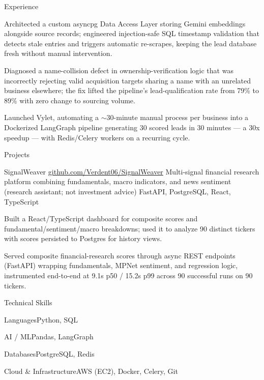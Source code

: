 \documentclass[
	11pt
]{../../../template}
\begin{document}
\begin{rSection}{E}{xperience}
\begin{rSectionEntry}
			\item Architected a custom asyncpg Data Access Layer storing Gemini embeddings alongside source records; engineered injection-safe SQL timestamp validation that detects stale entries and triggers automatic re-scrapes, keeping the lead database fresh without manual intervention.
			\item Diagnosed a name-collision defect in ownership-verification logic that was incorrectly rejecting valid acquisition targets sharing a name with an unrelated business elsewhere; the fix lifted the pipeline's lead-qualification rate from 79\% to 89\% with zero change to sourcing volume.
			\item Launched Vylet, automating a $\sim$30-minute manual process per business into a Dockerized LangGraph pipeline generating 30 scored leads in 30 minutes --- a 30x speedup --- with Redis/Celery workers on a recurring cycle.
		\end{rSectionEntry}
	\end{rSection}

	\begin{rSection}{P}{rojects}
		\begin{rSectionEntry}
			{SignalWeaver}
			{\href{https://github.com/Verdent06/SignalWeaver}{github.com/Verdent06/SignalWeaver}}
			{Multi-signal financial research platform combining fundamentals, macro indicators, and news sentiment (research assistant; not investment advice)}
			{FastAPI, PostgreSQL, React, TypeScript}
			{}

			\item Built a React/TypeScript dashboard for composite scores and fundamental/sentiment/macro breakdowns; used it to analyze 90 distinct tickers with scores persisted to Postgres for history views.
			\item Served composite financial-research scores through async REST endpoints (FastAPI) wrapping fundamentals, MPNet sentiment, and regression logic, instrumented end-to-end at 9.1s p50 / 15.2s p99 across 90 successful runs on 90 tickers.
		\end{rSectionEntry}
	\end{rSection}

	\begin{rSection}{T}{echnical Skills}
		\begin{rSet}{Languages}{Python, SQL}
		\end{rSet}
		\begin{rSet}{AI / ML}{Pandas, LangGraph}
		\end{rSet}
		\begin{rSet}{Databases}{PostgreSQL, Redis}
		\end{rSet}
		\begin{rSet}{Cloud \& Infrastructure}{AWS (EC2), Docker, Celery, Git}
		\end{rSet}
	\end{rSection}
\end{document}
